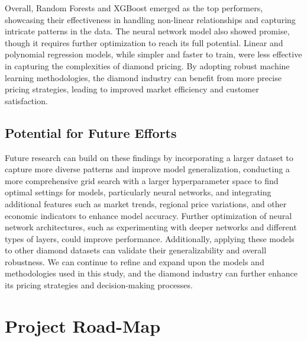 \documentclass[conference]{IEEEtran}
\begin{document}
Overall, Random Forests and XGBoost emerged as the top performers, showcasing their effectiveness in handling non-linear relationships and capturing intricate patterns in the data. The neural network model also showed promise, though it requires further optimization to reach its full potential. Linear and polynomial regression models, while simpler and faster to train, were less effective in capturing the complexities of diamond pricing. By adopting robust machine learning methodologies, the diamond industry can benefit from more precise pricing strategies, leading to improved market efficiency and customer satisfaction.

\subsection{Potential for Future Efforts}

Future research can build on these findings by incorporating a larger dataset to capture more diverse patterns and improve model generalization, conducting a more comprehensive grid search with a larger hyperparameter space to find optimal settings for models, particularly neural networks, and integrating additional features such as market trends, regional price variations, and other economic indicators to enhance model accuracy. Further optimization of neural network architectures, such as experimenting with deeper networks and different types of layers, could improve performance. Additionally, applying these models to other diamond datasets can validate their generalizability and overall robustness. We can continue to refine and expand upon the models and methodologies used in this study, and the diamond industry can further enhance its pricing strategies and decision-making processes.

\section{Project Road-Map}
\end{document}
